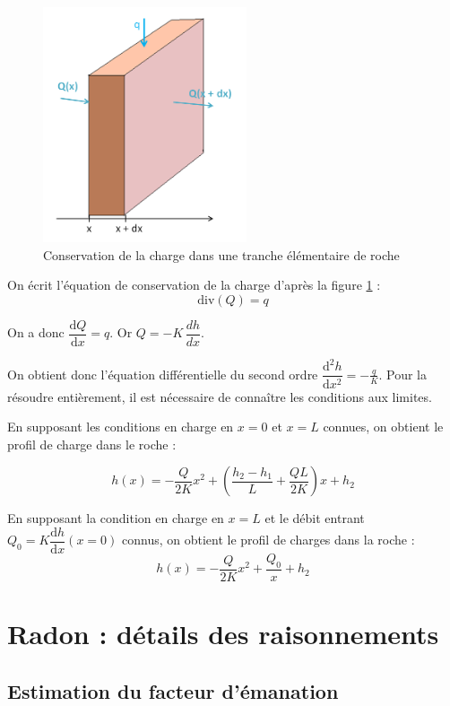 \documentclass{article}
\begin{document}
\begin{figure}[H]
    \centering
    \includegraphics[width=6cm]{A_III_B_4.png}
    \caption{Conservation de la charge dans une tranche élémentaire de roche}
    \label{fig:schema_carre_ecoulement}%
\end{figure}


On écrit l’équation de conservation de la charge d'après la figure \ref{fig:schema_carre_ecoulement} :
$$ \text{div} (Q)=q$$

On a donc $\dfrac{\text{d}Q}{\text{d}x}=q$.
Or $Q= -K\, \dfrac{dh}{dx}$.

On obtient donc l’équation différentielle du second ordre $\dfrac{\text{d}^2h}{\text{d}x^2}=-\frac{q}{K}$. 
Pour la résoudre entièrement, il est nécessaire de connaître les conditions aux limites. 

En supposant les conditions en charge en $x = 0$ et $x = L$ connues, on obtient le profil de charge dans le roche :

$$h(x) = -\frac{Q}{2K}x^2 + \left(\frac{h_2 - h_1}{L} + \frac{QL}{2K}\right)x + h_2$$


En supposant la condition en charge en $x = L$ et le débit entrant $Q_0 = K \dfrac{\text{d}h}{\text{d}x}(x = 0)$ connus, on obtient le profil de charges dans la roche :
$$h(x) = -\frac{Q}{2K}x^2 + \frac{Q_0}x + h_2$$

\newpage
\section{Radon : détails des raisonnements}
\label{annexe:detail_modele_radon_sec}
\subsection{Estimation du facteur d'émanation}
\label{annexe:emanation}
\end{document}
